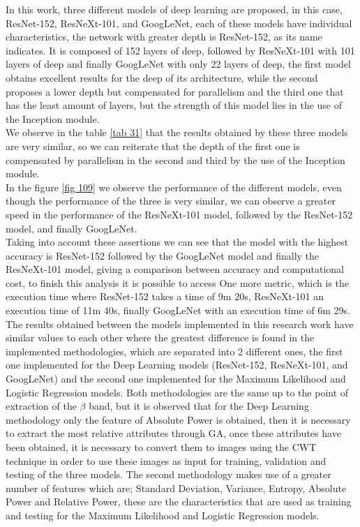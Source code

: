 \documentclass[letterpaper,12pt,openright,oneside]{article}
\begin{document}
In this work, three different models of deep learning are proposed, in this case, ResNet-152, ResNeXt-101, and GoogLeNet, each of these models have individual characteristics, the network with greater depth is ResNet-152, as its name indicates. It is composed of 152 layers of deep, followed by ResNeXt-101 with 101 layers of deep and finally GoogLeNet with only 22 layers of deep, the first model obtains excellent results for the deep of its architecture, while the second proposes a lower depth but compensated for parallelism and the third one that has the least amount of layers, but the strength of this model lies in the use of the Inception module.\\

We observe in the table \ref{tab 31} that the results obtained by these three models are very similar, so we can reiterate that the depth of the first one is compensated by parallelism in the second and third by the use of the Inception module.\\

In the figure \ref{fig 109} we observe the performance of the different models, even though the performance of the three is very similar, we can observe a greater speed in the performance of the ResNeXt-101 model, followed by the ResNet-152 model, and finally GoogLeNet.\\

Taking into account these assertions we can see that the model with the highest accuracy is ResNet-152 followed by the GoogLeNet model and finally the ResNeXt-101 model, giving a comparison between accuracy and computational cost, to finish this analysis it is possible to access One more metric, which is the execution time where ResNet-152 takes a time of 9m 20s, ResNeXt-101 an execution time of 11m 40s, finally GoogLeNet with an execution time of 6m 29s.\\



The results obtained between the models implemented in this research work have similar values to each other where the greatest  
difference is found in the implemented methodologies, which are separated into 2 different ones, the first one implemented for the Deep Learning models (ResNet-152, ResNeXt-101, and GoogLeNet) and the second one implemented for the Maximum Likelihood and Logistic Regression models. Both methodologies are the same up to the point of extraction of the $\beta$ band, but it is observed that for the Deep Learning methodology only the feature of Absolute Power is obtained, then it is necessary to extract the most relative attributes through GA, once these attributes have been obtained, it is necessary to convert them to images using the CWT technique in order to use these images as input for training, validation and testing of the three models. The second methodology makes use of a greater number of features which are; Standard Deviation, Variance, Entropy, Absolute Power and Relative Power, these are the characteristics that are used as training and testing for the Maximum Likelihood and Logistic Regression models.\\
\end{document}
